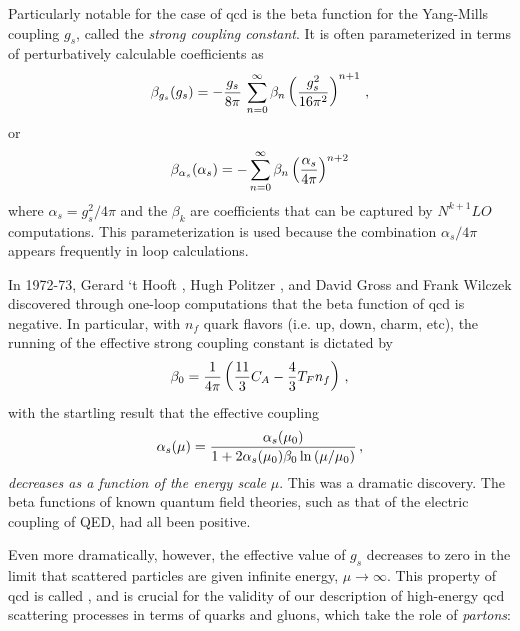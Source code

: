 Particularly notable for the case of \gls{qcd} is the beta function for the Yang-Mills coupling \(g_s\), called the \textit{strong coupling constant}.
%
It is often parameterized in terms of perturbatively calculable coefficients as
\begin{align}
    \beta_{g_s}(g_s)
    =
    -\frac{g_s}{8\pi}\,
    \sum_{n=0}^\infty \beta_n \left(\frac{g_s^2}{16\pi^2}\right)^{n+1}
    \,,
\end{align}
or
\begin{align}
    \beta_{\alpha_s}(\alpha_s)
    =
    -\sum_{n=0}^\infty \beta_n \left(\frac{\alpha_s}{4\pi}\right)^{n+2}
\end{align}
where \(\alpha_s = g_s^2 / 4 \pi\) and the \(\beta_k\) are coefficients that can be captured by \(N^{k+1}LO\) computations.
%
This parameterization is used because the combination \(\alpha_s / 4\pi\) appears frequently in loop calculations.

In 1972-73, Gerard `t Hooft \cite{tHooft:1998qmr}, Hugh Politzer \cite{Politzer:1973fx}, and David Gross and Frank Wilczek \cite{Gross:1973ju} discovered through one-loop computations that the beta function of \gls{qcd} is negative.
%
In particular, with \(n_f\) quark flavors (i.e. up, down, charm, etc), the  running of the effective strong coupling constant is dictated by
\begin{align}
    \beta_0 =
    \frac{1}{4\pi}\left(\frac{11}{3} C_A - \frac{4}{3} T_F n_f\right)
    \,,
\end{align}
with the startling result that the effective coupling
\begin{align}
    \alpha_s(\mu)
    =
    \frac{\alpha_s(\mu_0)}{1 + 2 \alpha_s(\mu_0) \beta_0 \ln\left(\mu / \mu_0\right)}
    \,,
\end{align}
\textit{decreases as a function of the energy scale} \(\mu\).
%
This was a dramatic discovery.
%
The beta functions of known quantum field theories, such as that of the electric coupling of QED, had all been positive.

Even more dramatically, however, the effective value of \(g_s\) decreases to zero in the limit that scattered particles are given infinite energy, \(\mu \to \infty\).
%
This property of \gls{qcd} is called , and is crucial for the validity of our description of high-energy \gls{qcd} scattering processes in terms of quarks and gluons, which take the role of \textit{partons}:


